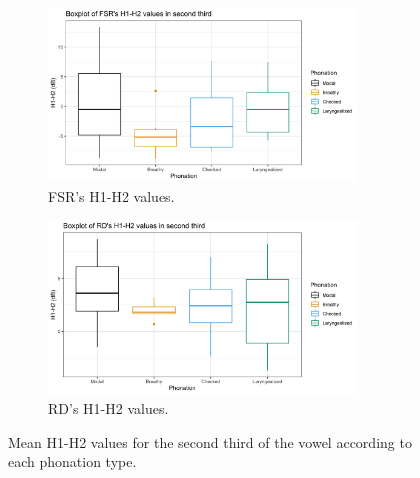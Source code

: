 \documentclass[12pt, letterpaper]{article}
\begin{document}
\begin{figure}[!ht]
	\centering
	\begin{subfigure}{.5\textwidth}
		\centering
		\includegraphics[width=0.9\textwidth]{../mean_FSR_h1h2_2nd.png}
		\caption{FSR's H1-H2 values.}
		\label{fig:FSRh1h2second} 
	\end{subfigure}%
	\begin{subfigure}{.5\textwidth}
		\centering
		\includegraphics[width=0.9\textwidth]{../mean_RD_h1h2_2nd.png}
		\caption{RD's H1-H2 values.}
		\label{fig:RDh1h2second} 
	\end{subfigure}
	\caption{Mean H1-H2 values for the second third of the vowel according to each phonation type.}
	\label{fig:h1h2second}
\end{figure}
\end{document}
